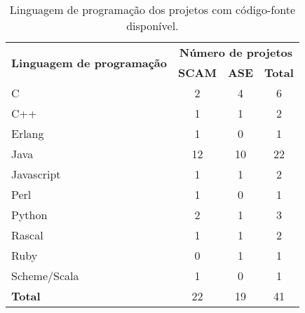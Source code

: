 \begin{table}[h]
\caption{Linguagem de programação dos projetos com código-fonte disponível.}
\centering
\begin{tabular}{l c c c}
  \hline
  \multirow{2}{*}{{\bf Linguagem de programação}} & \multicolumn{3}{c}{{\bf Número de projetos}} \\
                                             & {\bf SCAM} & {\bf ASE} & {\bf Total} \\
  \hline
  C &
    2 &
    4 &
    6 \\
  C++ &
    1 &
    1 &
    2 \\
  Erlang &
    1 &
    0 &
    1 \\
  Java &
    12 &
    10 &
    22 \\
  Javascript &
    1 &
    1 &
    2 \\
  Perl &
    1 &
    0 &
    1 \\
  Python &
    2 &
    1 &
    3 \\
  Rascal &
    1 &
    1 &
    2 \\
  Ruby &
    0 &
    1 &
    1 \\
  Scheme/Scala &
    1 &
    0 &
    1 \\
  \hline
  {\bf Total} & 22 & 19 & 41 \\
  \hline
\end{tabular}
\label{source-code-table}
\end{table}
